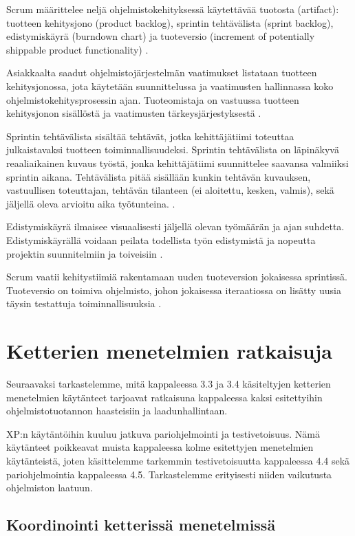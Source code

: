 \documentclass[finnish]{tktltiki2}
\theoremstyle{definition}
\theoremstyle{remark}
\begin{document}
{Scrum määrittelee neljä ohjelmistokehityksessä käytettävää tuotosta (artifact): tuotteen kehitysjono (product backlog), sprintin tehtävälista (sprint backlog), edistymiskäyrä (burndown chart) ja tuoteversio (increment of potentially shippable product functionality) \cite{SCH09}.

Asiakkaalta saadut ohjelmistojärjestelmän vaatimukset listataan tuotteen kehitysjonossa, jota käytetään suunnittelussa ja vaatimusten hallinnassa koko ohjelmistokehitysprosessin ajan. Tuoteomistaja on vastuussa tuotteen kehitysjonon sisällöstä ja vaatimusten tärkeysjärjestyksestä \cite{SCH09}.

Sprintin tehtävälista sisältää tehtävät, jotka kehittäjätiimi toteuttaa  julkaistavaksi tuotteen toiminnallisuudeksi. Sprintin tehtävälista on läpinäkyvä reaaliaikainen kuvaus työstä, jonka kehittäjätiimi suunnittelee saavansa valmiiksi sprintin aikana. Tehtävälista pitää sisällään kunkin tehtävän kuvauksen, vastuullisen toteuttajan, tehtävän tilanteen (ei aloitettu, kesken, valmis), sekä jäljellä oleva arvioitu aika työtunteina. \cite{SCH09}.

Edistymiskäyrä ilmaisee visuaalisesti jäljellä olevan työmäärän ja ajan suhdetta. Edistymiskäyrällä voidaan peilata todellista työn edistymistä ja nopeutta projektin suunnitelmiin ja toiveisiin \cite{SCH09}.

Scrum vaatii kehitystiimiä rakentamaan uuden tuoteversion jokaisessa sprintissä. Tuoteversio on toimiva ohjelmisto, johon jokaisessa iteraatiossa on lisätty uusia täysin testattuja toiminnallisuuksia \cite{SCH09}.

\section{Ketterien menetelmien ratkaisuja}

Seuraavaksi tarkastelemme, mitä kappaleessa 3.3 ja 3.4 käsiteltyjen ketterien menetelmien käytänteet tarjoavat ratkaisuna kappaleessa kaksi esitettyihin ohjelmistotuotannon haasteisiin ja laadunhallintaan.

XP:n käytäntöihin kuuluu jatkuva pariohjelmointi ja testivetoisuus. Nämä käytänteet poikkeavat muista kappaleessa kolme esitettyjen menetelmien käytänteistä, joten käsittelemme tarkemmin testivetoisuutta kappaleessa 4.4 sekä pariohjelmointia kappaleessa 4.5. Tarkastelemme erityisesti niiden vaikutusta ohjelmiston laatuun.  

\subsection{Koordinointi ketterissä menetelmissä}

}
\end{document}
